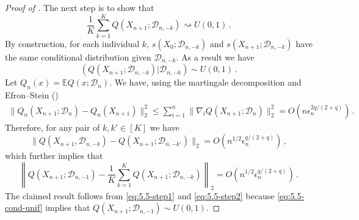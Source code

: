 \documentclass[11pt]{article}
\theoremstyle{plain}
\newcommand{\D}{{\mathcal{D}}}
\begin{document}
\begin{proof}[Proof of ]
The next step is to show that 
$$\frac{1}{K}\sum_{k=1}^{K}Q(X_{n+1};\D_{n,-k})\rightsquigarrow U(0,1)\,.$$
By construction, for each individual $k$, $s(X_0;\D_{n,-k})$ and $s(X_{n+1};\D_{n,-k})$ have the same conditional distribution given $\D_{n,-k}$.  As a result we have
\begin{equation}\label{eq:5.5-cond-unif}
\left(Q(X_{n+1};\D_{n,-k})\bigg|\D_{n,-k}\right)\sim U(0,1)\,.
\end{equation}
Let $Q_n(x) = \mathbb E Q(x;\D_n)$. 
We have, using the martingale decomposition and Efron--Stein ()
\begin{align*}
\|Q_n(X_{n+1};\D_n)-Q_n(X_{n+1})\|_2^2\le \sum_{i=1}^n \|\nabla_i Q(X_{n+1};\D_n)\|_2^2=O(n \epsilon_n^{2q/(2+q)})\,.
\end{align*}
Therefore, for any pair of $k,k'\in[K]$ we have
$$
\|Q(X_{n+1},\D_{n,-k})-Q(X_{n+1};\D_{n,-k'})\|_2=O(n^{1/2}\epsilon_n^{q/(2+q)})\,,
$$
which further implies that
\begin{equation}\label{eq:5.5-step2}
\left\|Q(X_{n+1};\D_{n,-1})-\frac{1}{K}\sum_{k=1}^{K}Q(X_{n+1};\D_{n,-k})\right\|_2=O(n^{1/2}\epsilon_n^{q/(2+q)})\,.    
\end{equation}
The claimed result follows from \eqref{eq:5.5-step1} and \eqref{eq:5.5-step2} because \eqref{eq:5.5-cond-unif} implies that $Q(X_{n+1};\D_{n,-1})\sim U(0,1)$.
\end{proof}
\end{document}
